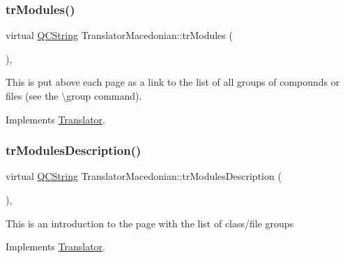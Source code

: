 \mbox{\label{class_translator_macedonian_acc63212e19deefca79cbd8f1caedbea7}} 
\subsubsection{\texorpdfstring{trModules()}{trModules()}}
{\footnotesize\ttfamily virtual \mbox{\hyperlink{class_q_c_string}{Q\+C\+String}} Translator\+Macedonian\+::tr\+Modules (\begin{DoxyParamCaption}{ }\end{DoxyParamCaption})\hspace{0.3cm}{\ttfamily [inline]}, {\ttfamily [virtual]}}

This is put above each page as a link to the list of all groups of compounds or files (see the \textbackslash{}group command). 

Implements \mbox{\hyperlink{class_translator}{Translator}}.

\mbox{\label{class_translator_macedonian_a006b26bbfd6b0d29d4424742ad2f38c0}} 
\subsubsection{\texorpdfstring{trModulesDescription()}{trModulesDescription()}}
{\footnotesize\ttfamily virtual \mbox{\hyperlink{class_q_c_string}{Q\+C\+String}} Translator\+Macedonian\+::tr\+Modules\+Description (\begin{DoxyParamCaption}{ }\end{DoxyParamCaption})\hspace{0.3cm}{\ttfamily [inline]}, {\ttfamily [virtual]}}

This is an introduction to the page with the list of class/file groups 

Implements \mbox{\hyperlink{class_translator}{Translator}}.

\mbox{\label{class_translator_macedonian_a0ad71c5feeeb8481c6cc35dccb65bfa4}} 
